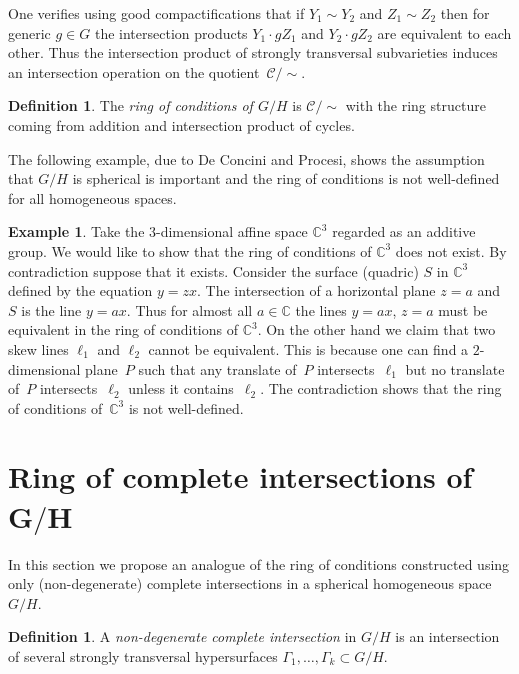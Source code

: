 \documentclass[10pt,a4paper]{amsart}
\def \C{\mathbb{C}}
\numberwithin{equation}{section}
\theoremstyle{definition}
\newtheorem{Ex}[Th]{Example}
\newtheorem{Def}[Th]{Definition}
\begin{document}
One verifies using good compactifications that if $Y_1 \sim Y_2$ and $Z_1 \sim Z_2$ then for generic $g\in G$ the intersection products $Y_1 \cdot gZ_1 $ and $Y_2 \cdot gZ_2$ are equivalent to each other. Thus the intersection product of strongly transversal subvarieties induces an intersection operation on the quotient~$\mathcal{C} /{\sim}$.

\begin{Def} \label{def-ring-of-conditions} The {\it ring of conditions of $G/H$} is $\mathcal{C} /{\sim}$ with the ring structure coming from addition and intersection product of cycles.
\end{Def}

The following example, due to De Concini and Procesi, shows the assumption that $G/H$ is spherical is important and the ring of conditions is not well-defined for all homogeneous spaces.
\begin{Ex} \label{ex-ring-of-cond-not-well-def}Take the $3$-dimensional affine space $\C^3$ regarded as an additive group. We would like to show that the ring of conditions of $\C^3$ does not exist. By contradiction suppose that it exists. Consider the surface (quadric) $S$ in $\C^3$ defined by the equation $y = zx$. The intersection of a horizontal plane $z=a$ and $S$ is the line $y=ax$. Thus for almost all $a\in \C$ the lines $y=ax$, $z=a$ must be equivalent in the ring of conditions of $\C^3$. On the other hand we claim that two skew lines $\ell_1$ and $\ell_2$ cannot be equivalent. This is because one can find a $2$-dimensional plane~$P$ such that any translate of~$P$ intersects~$\ell_1$ but no translate of~$P$ intersects~$\ell_2$ unless it contains~$\ell_2$. The contradiction shows that the ring of conditions of~$\C^3$ is not well-defined.
\end{Ex}

\section[Ring of complete intersections of $G/H$]{Ring of complete intersections of $\boldsymbol{G/H}$} \label{sec-ring-of-complete-intersec}

In this section we propose an analogue of the ring of conditions constructed using only (non-degenerate) complete intersections in a spherical homogeneous space~$G/H$.

\begin{Def} \label{def-non-degenerate-complete-intersection} A {\it non-degenerate complete intersection} in $G/H$ is an intersection of several strongly transversal hypersurfaces $\Gamma_1,\ldots, \Gamma_k\subset G/H$.
\end{Def}
\end{document}

